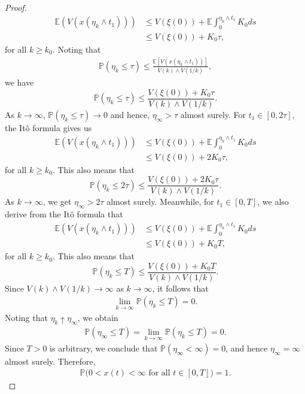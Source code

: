 \documentclass[11pt]{article}
\begin{document}
\begin{proof}
\begin{align*}
\mathbb{E}(V(x(\eta_k\wedge t_1)))&\le V(\xi(0))+\mathbb{E}\int_0^{\eta_k\wedge t_1}K_0ds\\
&\le V(\xi(0))+K_0\tau,
\end{align*}
for all $k\ge k_0$. Noting that
\begin{align*}
\mathbb{P}(\eta_k\le \tau)\le \frac{\mathbb{E}[V(x(\eta_k\wedge t_1))]}{V(k)\wedge V(1/k)}, 
\end{align*}
we have
\begin{equation*}
\mathbb{P}(\eta_k\le \tau)\le \frac{V(\xi(0))+K_0\tau}{V(k)\wedge V(1/k)}.
\end{equation*}
As $k\rightarrow \infty$, $ \mathbb{P}(\eta_k\leq \tau)\rightarrow 0 $ and hence, $ \eta_{\infty}>\tau$ almost surely. For $t_1\in [0,2\tau]$, the It\^{o} formula gives us
\begin{align*}
\mathbb{E}(V(x(\eta_k\wedge t_1)))&\le V(\xi(0))+\mathbb{E}\int_0^{\eta_k\wedge t_1}K_0ds\\
&\le V(\xi(0))+2K_0\tau,
\end{align*}
for all $k\ge k_0$. This also means that 
\begin{equation*}
\mathbb{P}(\eta_k\le 2\tau)\le \frac{V(\xi(0))+2K_0\tau}{V(k)\wedge V(1/k)}.
\end{equation*}
As $k\rightarrow \infty$, we get $ \eta_{\infty}>2\tau$ almost surely. Meanwhile, for $t_1\in [0,T]$, we also derive from the It\^{o} formula that 
\begin{align*}
\mathbb{E}(V(x(\eta_k\wedge t_1)))&\le V(\xi(0))+\mathbb{E}\int_0^{\eta_k\wedge t_1}K_0ds\\
&\le V(\xi(0))+K_0T,
\end{align*}
for all $k\ge k_0$. This also means that 
\begin{equation}\label{probability1}
\mathbb{P}(\eta_k\le T)\le \frac{V(\xi(0))+K_0T}{V(k)\wedge V(1/k)}.
\end{equation}
Since $V(k)\wedge V(1/k)\to\infty$ as $k\to\infty$, it follows that
\begin{align*}
\lim_{k\to\infty} \mathbb{P}(\eta_k\le T)=0.
\end{align*}
Noting that $\eta_k \uparrow \eta_\infty$, we obtain
\begin{align*}
\mathbb{P}(\eta_\infty \le T)
= \lim_{k\to\infty} \mathbb{P}(\eta_k \le T)
= 0.
\end{align*}
Since $T>0$ is arbitrary, we conclude that $\mathbb{P}(\eta_\infty < \infty)=0$, and hence $\eta_\infty=\infty$ almost surely. Therefore,
\begin{align*}
\mathbb{P}\big(0 < x(t) < \infty \text{ for all } t \in [0,T]\big)=1.
\end{align*}
\end{proof}
\end{document}
